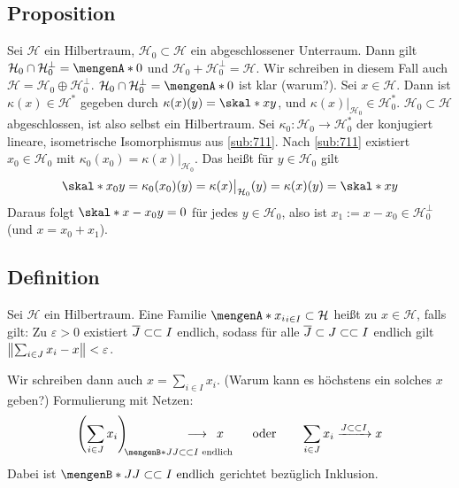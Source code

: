 \subsection[Proposition über Schnitt und Summe eines Unterraumes mit seinem orthogonalen Komplement]{Proposition} %
\label{sub:715}
Sei $\mathcal{H}$ ein Hilbertraum, $\mathcal{H}_0 \subset \mathcal{H}$ ein abgeschlossener Unterraum. Dann gilt $\mathcal{H}_0 \cap \mathcal{H}_0^\bot = \set{0}$ und 
$\mathcal{H}_0 + \mathcal{H}_0^\bot = \mathcal{H}$. Wir schreiben in diesem Fall auch $\mathcal{H} = \mathcal{H}_0 \oplus \mathcal{H}_0^\bot$.
$\mathcal{H}_0 \cap \mathcal{H}_0^\bot= \set{0}$ ist klar (warum?). Sei $x \in \mathcal{H}$. Dann ist $\kappa(x) \in \mathcal{H}^*$ gegeben durch 
$\kappa(x)(y)=\skal*{x}{y}$, und $\kappa(x)|_{\mathcal{H}_0} \in \mathcal{H}_0^*$. $\mathcal{H}_0 \subset \mathcal{H}$ abgeschlossen, ist also selbst ein Hilbertraum. 
Sei $\kappa_0 \colon \mathcal{H}_0 \to \mathcal{H}_0^*$ der konjugiert lineare, isometrische Isomorphismus aus \ref{sub:711}. Nach \ref{sub:711} existiert 
$x_0 \in \mathcal{H}_0$ mit $\kappa_0(x_0)= \kappa(x)|_{\mathcal{H}_0}$. Das heißt für $y \in \mathcal{H}_0$ gilt 
\begin{align*}
	\skal*{x_0}{y} = \kappa_0(x_0)(y) = \kappa(x)\big|_{\mathcal{H}_0}(y) = \kappa(x)(y) = \skal*{x}{y}
\end{align*}
Daraus folgt $\skal*{x-x_0}{y}=0$ für jedes $y \in \mathcal{H_0}$, also ist $x_1 := x-x_0 \in \mathcal{H}_0^\bot$ (und $x=x_0+x_1$). \bewende

\subsection[Definition: Summierbar]{Definition} %
\label{sub:716}
Sei $\mathcal{H}$ ein Hilbertraum. Eine Familie $\set{x_i}_{i \in I} \subset \mathcal{H}$ heißt  zu $x \in \mathcal{H}$, falls gilt: 
Zu $\varepsilon>0$ existiert $\overline{J} \subset\mkern-0.7mu \subset I$ endlich, sodass für alle $\overline{J} \subset J \subset\mkern-0.7mu \subset I$ endlich gilt $\norm{\sum_{i \in J}x_i - x } < \varepsilon$.

Wir schreiben dann auch $x= \sum_{i \in I} x_i$. (Warum kann es höchstens ein solches $x$ geben?) Formulierung mit Netzen: 
\[
	\enbrace*{\sum_{i \in J} x_i}_{\!\!\set[J]{J \finSub I \text{ endlich}}} \hspace{-4em} \longrightarrow \enspace x \qquad \text{ oder} \qquad \sum_{i \in J}x_i \xrightarrow{J \finSub I} x 
\]
Dabei ist $\set[J]{J \finSub I \text{ endlich}}$ gerichtet bezüglich Inklusion.

